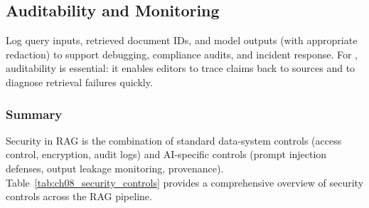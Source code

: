 \subsection{Auditability and Monitoring}
Log query inputs, retrieved document IDs, and model outputs (with appropriate redaction) to support debugging, compliance audits, and incident response. For \ishtar{}, auditability is essential: it enables editors to trace claims back to sources and to diagnose retrieval failures quickly.

\subsubsection*{Summary}
Security in RAG is the combination of standard data-system controls (access control, encryption, audit logs) and AI-specific controls (prompt injection defenses, output leakage monitoring, provenance). Table~\ref{tab:ch08_security_controls} provides a comprehensive overview of security controls across the RAG pipeline.


